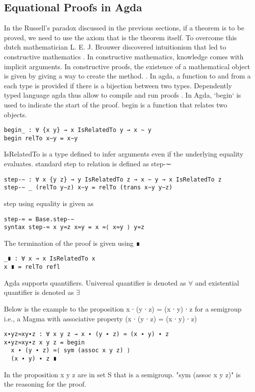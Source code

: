 \subsection{Equational Proofs in Agda}
In the Russell's paradox discussed in the previous sections, if a theorem is to be proved, we need to use the axiom that is the theorem itself. To overcome this dutch mathematician L. E. J. Brouwer discovered intuitionism that led to constructive mathematics \cite{enwiki:1122615242}. In constructive mathematics, knowledge comes with implicit arguments. In constructive proofs, the existence of a mathematical object is given by giving a way to create the method. \cite{enwiki:1090644431}. In agda, a function to and from a each type is provided if there is a bijection between two types. Dependently typed language agda thus allow to compile and run proofs \cite{kidney2020finiteness}.  
In Agda, `begin` is used to indicate the start of the proof. begin is a function that relates two objects. 
\begin{Verbatim}
begin_ : ∀ {x y} → x IsRelatedTo y → x ∼ y
begin relTo x∼y = x∼y
\end{Verbatim}
IsRelatedTo is a type defined to infer arguments even if the underlying equality evaluates. standard step to relation is defined as step-∼
\begin{Verbatim}
step-∼ : ∀ x {y z} → y IsRelatedTo z → x ∼ y → x IsRelatedTo z
step-∼ _ (relTo y∼z) x∼y = relTo (trans x∼y y∼z)
\end{Verbatim}
step using equality is given as
\begin{Verbatim}
step-≈ = Base.step-∼
syntax step-≈ x y≈z x≈y = x ≈⟨ x≈y ⟩ y≈z
\end{Verbatim}
The termination of the proof is given using \textunderscore ∎
\begin{Verbatim}
_∎ : ∀ x → x IsRelatedTo x
x ∎ = relTo refl
\end{Verbatim}
Agda supports quantifiers. Universal quantifier is denoted as \(\forall\) and existential quantifier is denoted as \(\exists\) 

Below is the example to the proposition x ∙ (y ∙ z) = (x ∙ y) ∙ z  for a semigroup i.e., a Magma with associative property (x ∙ (y ∙ z) = (x ∙ y) ∙ z) 
\begin{Verbatim}
x∙yz≈xy∙z : ∀ x y z → x ∙ (y ∙ z) ≈ (x ∙ y) ∙ z
x∙yz≈xy∙z x y z = begin 
  x ∙ (y ∙ z) ≈⟨ sym (assoc x y z) ⟩ 
  (x ∙ y) ∙ z ∎
\end{Verbatim}
In the proposition x y z are in set S that is a semigroup. "sym (assoc x y z)" is the reasoning for the proof.

